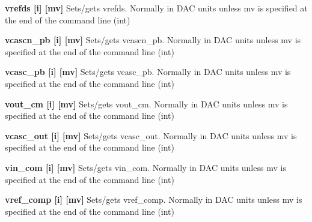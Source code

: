 \begin{DoxyItemize}
\item {\bfseries vrefds \mbox{[}i\mbox{]} \mbox{[}mv\mbox{]}} Sets/gets vrefds. Normally in DAC units unless {\ttfamily mv} is specified at the end of the command line (int)
\end{DoxyItemize}


\begin{DoxyItemize}
\item {\bfseries vcascn\_\-pb \mbox{[}i\mbox{]} \mbox{[}mv\mbox{]}} Sets/gets vcascn\_\-pb. Normally in DAC units unless {\ttfamily mv} is specified at the end of the command line (int)
\end{DoxyItemize}


\begin{DoxyItemize}
\item {\bfseries vcasc\_\-pb \mbox{[}i\mbox{]} \mbox{[}mv\mbox{]}} Sets/gets vcasc\_\-pb. Normally in DAC units unless {\ttfamily mv} is specified at the end of the command line (int)
\end{DoxyItemize}


\begin{DoxyItemize}
\item {\bfseries vout\_\-cm \mbox{[}i\mbox{]} \mbox{[}mv\mbox{]}} Sets/gets vout\_\-cm. Normally in DAC units unless {\ttfamily mv} is specified at the end of the command line (int)
\end{DoxyItemize}


\begin{DoxyItemize}
\item {\bfseries vcasc\_\-out \mbox{[}i\mbox{]} \mbox{[}mv\mbox{]}} Sets/gets vcasc\_\-out. Normally in DAC units unless {\ttfamily mv} is specified at the end of the command line (int)
\end{DoxyItemize}


\begin{DoxyItemize}
\item {\bfseries vin\_\-com \mbox{[}i\mbox{]} \mbox{[}mv\mbox{]}} Sets/gets vin\_\-com. Normally in DAC units unless {\ttfamily mv} is specified at the end of the command line (int)
\end{DoxyItemize}


\begin{DoxyItemize}
\item {\bfseries vref\_\-comp \mbox{[}i\mbox{]} \mbox{[}mv\mbox{]}} Sets/gets vref\_\-comp. Normally in DAC units unless {\ttfamily mv} is specified at the end of the command line (int)
\end{DoxyItemize}


